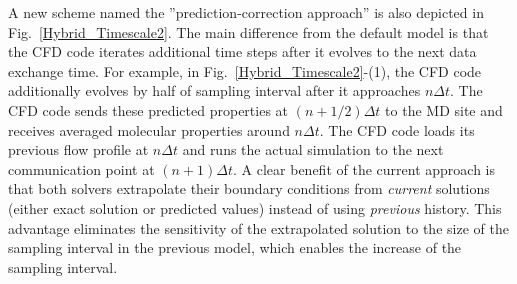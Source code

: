 \documentclass[preprint,12pt]{elsarticle}
\begin{document}

A new scheme named the ''prediction-correction approach'' is also depicted in Fig.~\ref{Hybrid_Timescale2}. The main difference from the default model is that the CFD code iterates additional time steps after it evolves to the next data exchange time. For example, in Fig.~\ref{Hybrid_Timescale2}-(1), the CFD code additionally evolves by half of sampling interval after it approaches $n{\Delta}t$. The CFD code sends these predicted properties at $(n+1/2){\Delta}t$ to the MD site and receives averaged molecular properties around $n{\Delta}t$. The CFD code loads its previous flow profile at $n{\Delta}t$ and runs the actual simulation to the next communication point at $(n+1){\Delta}t$. A clear benefit of the current approach is that both solvers extrapolate their boundary conditions from \textit{current} solutions (either exact solution or predicted values) instead of using \textit{previous} history. This advantage eliminates the sensitivity of the extrapolated solution to the size of the sampling interval in the previous model, which enables the increase of the sampling interval.
\end{document}
